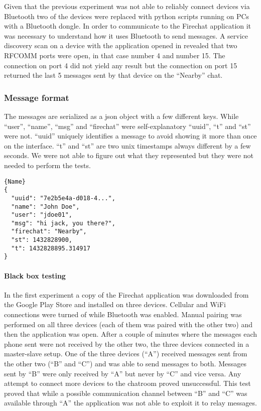 Given that the previous experiment was not able to reliably connect devices via Bluetooth two of the devices were replaced with python scripts running on PCs with a Bluetooth dongle.
In order to communicate to the Firechat application it was necessary to understand how it uses Bluetooth to send messages.
A service discovery scan on a device with the application opened in revealed that two RFCOMM ports were open, in that case number 4 and number 15.
The connection on port 4 did not yield any result but the connection on port 15 returned the last 5 messages sent by that device on the ``Nearby'' chat.

\subsubsection{Message format}
The messages are serialized as a json object with a few different keys.
While ``user'', ``name'', ``msg'' and ``firechat'' were self-explanatory ``uuid'', ``t'' and ``st'' were not.
``uuid'' uniquely identifies a message to avoid showing it more than once on the interface.
``t'' and ``st'' are two unix timestamps \cite{unix-timestamp} always different by a few seconds.
We were not able to figure out what they represented but they were not needed to perform the tests. 

\begin{lstlisting}[caption=Sample Message,frame=tlrb]{Name}
{
  "uuid": "7e2b5e4a-d018-4...",
  "name": "John Doe",
  "user": "jdoe01",
  "msg": "hi jack, you there?",
  "firechat": "Nearby",
  "st": 1432828900,
  "t": 1432828895.314917
}
\end{lstlisting}

\paragraph{Black box testing}
In the first experiment a copy of the Firechat application was downloaded from the Google Play Store \cite{google-play-store} and installed on three devices.
Cellular and WiFi connections were turned of while Bluetooth was enabled.
Manual pairing was performed on all three devices (each of them was paired with the other two) and then the application was open.
After a couple of minutes where the messages each phone sent were not received by the other two, the three devices connected in a master-slave setup.
One of the three devices (``A'') received messages sent from the other two (``B'' and ``C'') and was able to send messages to both.
Messages sent by ``B'' were only received by ``A'' but never by ``C'' and vice versa.
Any attempt to connect more devices to the chatroom proved unsuccessful.
This test proved that while a possible communication channel between ``B'' and ``C'' was available through ``A'' the application was not able to exploit it to relay messages.

